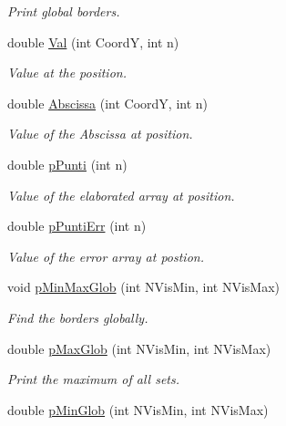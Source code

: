 \begin{DoxyCompactItemize}
\begin{DoxyCompactList}\small\item\em Print global borders. \end{DoxyCompactList}\item 
double \hyperlink{classVarDatFile_a2b1e58fd6ed28920042681b8e27f369f}{Val} (int CoordY, int n)
\begin{DoxyCompactList}\small\item\em Value at the position. \end{DoxyCompactList}\item 
double \hyperlink{classVarDatFile_a3f23e3592344b829371e42e77ed02d15}{Abscissa} (int CoordY, int n)
\begin{DoxyCompactList}\small\item\em Value of the Abscissa at position. \end{DoxyCompactList}\item 
double \hyperlink{classVarDatFile_aceb09b397fee83699a8b810fcaa02d26}{p\+Punti} (int n)
\begin{DoxyCompactList}\small\item\em Value of the elaborated array at position. \end{DoxyCompactList}\item 
double \hyperlink{classVarDatFile_a3a14794e0583788d1cd614bfa4aa4a17}{p\+Punti\+Err} (int n)
\begin{DoxyCompactList}\small\item\em Value of the error array at postion. \end{DoxyCompactList}\item 
void \hyperlink{classVarDatFile_a46c8b0d765845804061b9ed216e96555}{p\+Min\+Max\+Glob} (int N\+Vis\+Min, int N\+Vis\+Max)\hypertarget{classVarDatFile_a46c8b0d765845804061b9ed216e96555}{}\label{classVarDatFile_a46c8b0d765845804061b9ed216e96555}

\begin{DoxyCompactList}\small\item\em Find the borders globally. \end{DoxyCompactList}\item 
double \hyperlink{classVarDatFile_a3842ee06d27e5ffab8330b9a42abe651}{p\+Max\+Glob} (int N\+Vis\+Min, int N\+Vis\+Max)\hypertarget{classVarDatFile_a3842ee06d27e5ffab8330b9a42abe651}{}\label{classVarDatFile_a3842ee06d27e5ffab8330b9a42abe651}

\begin{DoxyCompactList}\small\item\em Print the maximum of all sets. \end{DoxyCompactList}\item 
double \hyperlink{classVarDatFile_abb5cfc85ebb62f7226afe58ab7f70f68}{p\+Min\+Glob} (int N\+Vis\+Min, int N\+Vis\+Max)\hypertarget{classVarDatFile_abb5cfc85ebb62f7226afe58ab7f70f68}{}\label{classVarDatFile_abb5cfc85ebb62f7226afe58ab7f70f68}


\end{DoxyCompactItemize}
